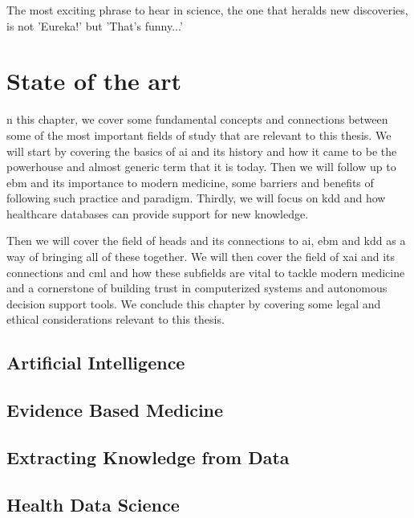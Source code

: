 
\begin{savequote}[75mm]
The most exciting phrase to hear in science, the one that heralds new discoveries, is not 'Eureka!' but 'That's funny...'
\end{savequote}
\chapter{State of the art} \label{chap:sota}


n this chapter, we cover some fundamental concepts and connections between some of the most important fields of study that are relevant to this thesis. We will start by covering the basics of \ac{ai} and its history and how it came to be the powerhouse and almost generic term that it is today. Then we will follow up to \ac{ebm} and its importance to modern medicine, some barriers and benefits of following such practice and paradigm. Thirdly, we will focus on \ac{kdd} and how healthcare databases can provide support for new knowledge.

Then we will cover the field of \ac{heads} and its connections to \ac{ai}, \ac{ebm} and \ac{kdd} as a way of bringing all of these together. We will then cover the field of \ac{xai} and its connections and \ac{cml} and how these subfields are vital to tackle modern medicine and a cornerstone of building trust in computerized systems and autonomous decision support tools. We conclude this chapter by covering some legal and ethical considerations relevant to this thesis.


\section{Artificial Intelligence}


\section{Evidence Based Medicine}\label{subsec:ebm}




\section{Extracting Knowledge from Data}\label{sec:kdd}



\section{Health Data Science}

